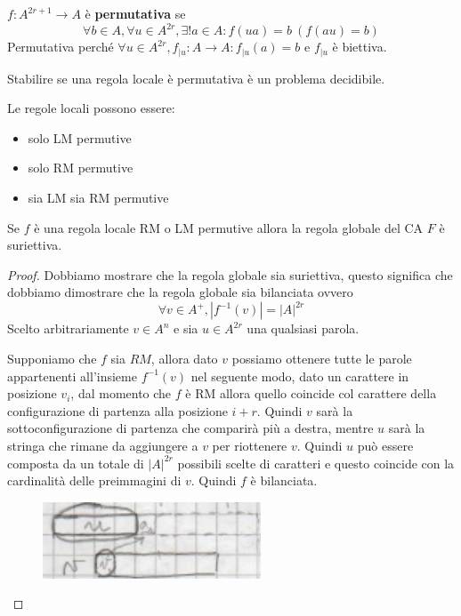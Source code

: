 \begin{definizione}
    $f:A^{2r+1}\rightarrow A$ è \textbf{permutativa} se
    $$\forall b\in A, \forall u \in A^{2r}, \exists ! a\in A: f(ua)=b \ (f(au)=b)$$
    Permutativa perché $\forall u \in A^{2r}, f_{|u}:A\rightarrow A:f_{|u}(a) = b$
    e $f_{|u}$ è biettiva.
\end{definizione}

\begin{teorema}
    Stabilire se una regola locale è permutativa è un problema decidibile.
\end{teorema}

\begin{nota}
    Le regole locali possono essere:
    \begin{itemize}
        \item solo LM permutive
        \item solo RM permutive
        \item sia LM sia RM permutive
    \end{itemize}
\end{nota}

\begin{teorema}
    Se $f$ è una regola locale RM o LM permutive allora la regola globale del CA
    $F$ è suriettiva.
    \begin{proof}
        Dobbiamo mostrare che la regola globale sia suriettiva, questo significa
        che dobbiamo dimostrare che la regola globale sia bilanciata ovvero
        $$\forall v \in A^+, |f^{-1}(v)| = |A|^{2r}$$
        Scelto arbitrariamente $v\in A^n$ e sia $u\in A^{2r}$ una qualsiasi parola.

        Supponiamo che $f$ sia $RM$, allora dato $v$ possiamo ottenere tutte le parole
        appartenenti all'insieme $f^{-1}(v)$ nel seguente modo, dato un carattere
        in posizione $v_i$, dal momento che $f$ è RM allora quello coincide col
        carattere della configurazione di partenza alla posizione $i+r$. Quindi
        $v$ sarà la sottoconfigurazione di partenza che comparirà più a destra,
        mentre $u$ sarà la stringa che rimane da aggiungere a $v$ per riottenere $v$.
        Quindi $u$ può essere composta da un totale di $|A|^{2r}$ possibili scelte
        di caratteri e questo coincide con la cardinalità delle preimmagini di $v$.
        Quindi $f$ è bilanciata.
        \begin{figure}[!h]
            \centering
            \includegraphics[width=.3\textwidth]{img/sistemi_complessi/preimmagini.png}
        \end{figure}
    \end{proof}
\end{teorema}

